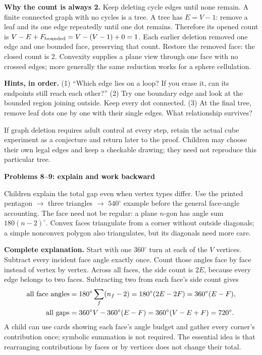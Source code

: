 \documentclass[11pt,letterpaper]{article}
\newcommand{\titleline}[1]{\par{\Large\bfseries #1}\par\vspace{4pt}}
\newcommand{\sub}[1]{\par\vspace{3pt}{\bfseries #1}\par}
\newcommand{\hints}[3]{\textbf{Hints, in order.} (1) #1 (2) #2 (3) #3\par}
\newcommand{\degc}{^{\circ}}
\begin{document}
\textbf{Why the count is always 2.} Keep deleting cycle edges until none remain. A finite connected graph with no cycles is a tree. A tree has $E=V-1$: remove a leaf and its one edge repeatedly until one dot remains. Therefore its opened count is $V-E+F_{\rm bounded}=V-(V-1)+0=1$. Each earlier deletion removed one edge and one bounded face, preserving that count. Restore the removed face: the closed count is 2. Convexity supplies a plane view through one face with no crossed edges; more generally the same reduction works for a sphere cellulation.

\hints{``Which edge lies on a loop? If you erase it, can its endpoints still reach each other?''}{Try one boundary edge and look at the bounded region joining outside. Keep every dot connected.}{At the final tree, remove leaf dots one by one with their single edges. What relationship survives?}
If graph deletion requires adult control at every step, retain the actual cube experiment as a conjecture and return later to the proof. Children may choose their own legal edges and keep a checkable drawing; they need not reproduce this particular tree.

\newpage
\titleline{Problems 8--9: explain and work backward}
\sub{Problem 8 / student p.8 / deeper continuation}
Children explain the total gap even when vertex types differ. Use the printed pentagon $\rightarrow$ three triangles $\rightarrow$ $540\degc$ example before the general face-angle accounting. The face need not be regular: a plane $n$-gon has angle sum $180(n-2)\degc$. Convex faces triangulate from a corner without outside diagonals; a simple nonconvex polygon also triangulates, but its diagonals need more care.

\textbf{Complete explanation.} Start with one $360\degc$ turn at each of the $V$ vertices. Subtract every incident face angle exactly once. Count those angles face by face instead of vertex by vertex. Across all faces, the side count is $2E$, because every edge belongs to two faces. Subtracting two from each face's side count gives
\[
\begin{aligned}
\hbox{all face angles}&=180\degc\sum_{f}(n_f-2)
 =180\degc(2E-2F)=360\degc(E-F),\\
\hbox{all gaps}&=360\degc V-360\degc(E-F)
 =360\degc(V-E+F)=720\degc.
\end{aligned}
\]
A child can use cards showing each face's angle budget and gather every corner's contribution once; symbolic summation is not required. The essential idea is that rearranging contributions by faces or by vertices does not change their total.
\end{document}
